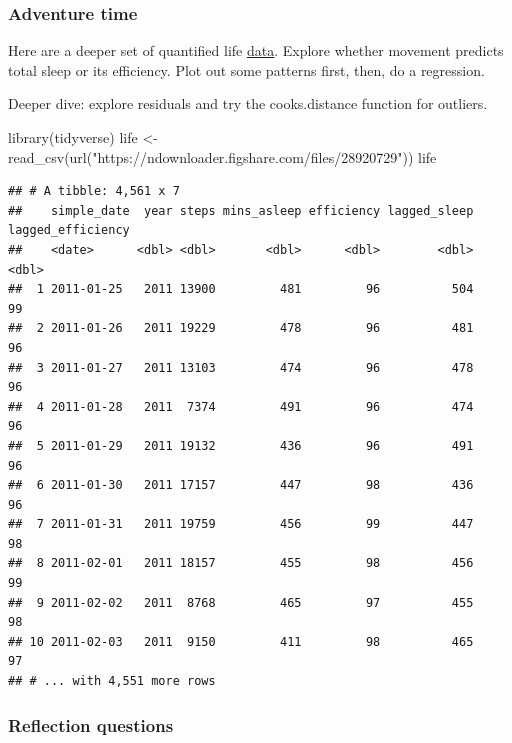 \documentclass[
]{book}
\newenvironment{Shaded}{\begin{snugshade}}{\end{snugshade}}
\newcommand{\FunctionTok}[1]{\textcolor[rgb]{0.00,0.00,0.00}{#1}}
\newcommand{\NormalTok}[1]{#1}
\newcommand{\OtherTok}[1]{\textcolor[rgb]{0.56,0.35,0.01}{#1}}
\newcommand{\StringTok}[1]{\textcolor[rgb]{0.31,0.60,0.02}{#1}}
\begin{document}
\hypertarget{adventure-time-2}{%
\subsubsection*{Adventure time}\label{adventure-time-2}}

Here are a deeper set of quantified life \href{https://figshare.com/articles/dataset/Quantified_life/12803105}{data}. Explore whether movement predicts total sleep or its efficiency. Plot out some patterns first, then, do a regression.

Deeper dive: explore residuals and try the cooks.distance function for outliers.

\begin{Shaded}
\begin{Highlighting}[]
\FunctionTok{library}\NormalTok{(tidyverse)}
\NormalTok{life }\OtherTok{\textless{}{-}} \FunctionTok{read\_csv}\NormalTok{(}\FunctionTok{url}\NormalTok{(}\StringTok{"https://ndownloader.figshare.com/files/28920729"}\NormalTok{))}
\NormalTok{life}
\end{Highlighting}
\end{Shaded}

\begin{verbatim}
## # A tibble: 4,561 x 7
##    simple_date  year steps mins_asleep efficiency lagged_sleep lagged_efficiency
##    <date>      <dbl> <dbl>       <dbl>      <dbl>        <dbl>             <dbl>
##  1 2011-01-25   2011 13900         481         96          504                99
##  2 2011-01-26   2011 19229         478         96          481                96
##  3 2011-01-27   2011 13103         474         96          478                96
##  4 2011-01-28   2011  7374         491         96          474                96
##  5 2011-01-29   2011 19132         436         96          491                96
##  6 2011-01-30   2011 17157         447         98          436                96
##  7 2011-01-31   2011 19759         456         99          447                98
##  8 2011-02-01   2011 18157         455         98          456                99
##  9 2011-02-02   2011  8768         465         97          455                98
## 10 2011-02-03   2011  9150         411         98          465                97
## # ... with 4,551 more rows
\end{verbatim}

\hypertarget{reflection-questions-2}{%
\subsubsection*{Reflection questions}\label{reflection-questions-2}}
\end{document}
